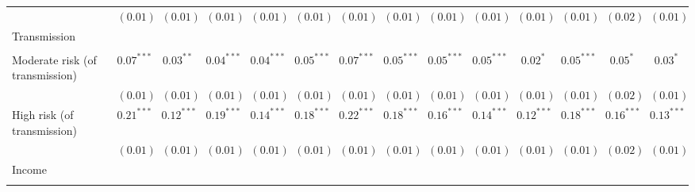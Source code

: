 \begin{sidewaystable}
\begin{center}
\begin{scriptsize}
\begin{tabular}{l c c c c c c c c c c c c c}
                                                & $(0.01)$      & $(0.01)$      & $(0.01)$      & $(0.01)$      & $(0.01)$     & $(0.01)$      & $(0.01)$      & $(0.01)$     & $(0.01)$      & $(0.01)$      & $(0.01)$      & $(0.02)$      & $(0.01)$      \\
Transmission                                    &               &               &               &               &              &               &               &              &               &               &               &               &               \\
                                                &               &               &               &               &              &               &               &              &               &               &               &               &               \\
\quad Moderate risk (of transmission)           & $0.07^{***}$  & $0.03^{**}$   & $0.04^{***}$  & $0.04^{***}$  & $0.05^{***}$ & $0.07^{***}$  & $0.05^{***}$  & $0.05^{***}$ & $0.05^{***}$  & $0.02^{*}$    & $0.05^{***}$  & $0.05^{*}$    & $0.03^{*}$    \\
                                                & $(0.01)$      & $(0.01)$      & $(0.01)$      & $(0.01)$      & $(0.01)$     & $(0.01)$      & $(0.01)$      & $(0.01)$     & $(0.01)$      & $(0.01)$      & $(0.01)$      & $(0.02)$      & $(0.01)$      \\
\quad High risk (of transmission)               & $0.21^{***}$  & $0.12^{***}$  & $0.19^{***}$  & $0.14^{***}$  & $0.18^{***}$ & $0.22^{***}$  & $0.18^{***}$  & $0.16^{***}$ & $0.14^{***}$  & $0.12^{***}$  & $0.18^{***}$  & $0.16^{***}$  & $0.13^{***}$  \\
                                                & $(0.01)$      & $(0.01)$      & $(0.01)$      & $(0.01)$      & $(0.01)$     & $(0.01)$      & $(0.01)$      & $(0.01)$     & $(0.01)$      & $(0.01)$      & $(0.01)$      & $(0.02)$      & $(0.01)$      \\
Income                                          &               &               &               &               &              &               &               &              &               &               &               &               &               \\
                                                &               &               &               &               &              &               &               &              &               &               &               &               &               \\

\end{tabular}
\end{scriptsize}
\end{center}
\end{sidewaystable}
